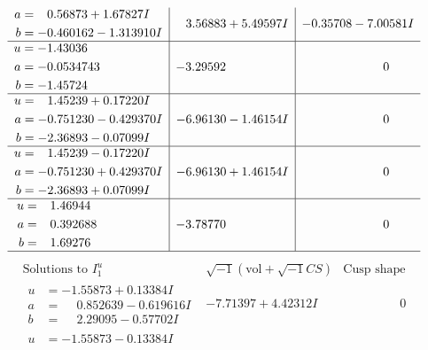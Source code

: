 \documentclass[1p]{elsarticle_modified}
\theoremstyle{definition}
\newcommand{\I}{\sqrt{-1}}
\begin{document}
$$\begin{array}{c|c|c}
\begin{aligned}
a &= \phantom{-}0.56873 + 1.67827 I \\
b &= -0.460162 - 1.313910 I\end{aligned}
 & \phantom{-}3.56883 + 5.49597 I & -0.35708 - 7.00581 I \\ \hline\begin{aligned}
u &= -1.43036\phantom{ +0.000000I} \\
a &= -0.0534743\phantom{ +0.000000I} \\
b &= -1.45724\phantom{ +0.000000I}\end{aligned}
 & -3.29592\phantom{ +0.000000I} & \phantom{-0.000000 } 0 \\ \hline\begin{aligned}
u &= \phantom{-}1.45239 + 0.17220 I \\
a &= -0.751230 - 0.429370 I \\
b &= -2.36893 - 0.07099 I\end{aligned}
 & -6.96130 - 1.46154 I & \phantom{-0.000000 } 0 \\ \hline\begin{aligned}
u &= \phantom{-}1.45239 - 0.17220 I \\
a &= -0.751230 + 0.429370 I \\
b &= -2.36893 + 0.07099 I\end{aligned}
 & -6.96130 + 1.46154 I & \phantom{-0.000000 } 0 \\ \hline\begin{aligned}
u &= \phantom{-}1.46944\phantom{ +0.000000I} \\
a &= \phantom{-}0.392688\phantom{ +0.000000I} \\
b &= \phantom{-}1.69276\phantom{ +0.000000I}\end{aligned}
 & -3.78770\phantom{ +0.000000I} & \phantom{-0.000000 } 0\\
 \hline 
 \end{array}$$\newpage$$\begin{array}{c|c|c}  
\text{Solutions to }I^u_{1}& \I (\text{vol} + \sqrt{-1}CS) & \text{Cusp shape}\\
 \hline 
\begin{aligned}
u &= -1.55873 + 0.13384 I \\
a &= \phantom{-}0.852639 - 0.619616 I \\
b &= \phantom{-}2.29095 - 0.57702 I\end{aligned}
 & -7.71397 + 4.42312 I & \phantom{-0.000000 } 0 \\ \hline\begin{aligned}
u &= -1.55873 - 0.13384 I \\

\end{aligned}
\end{array}$$
\end{document}
